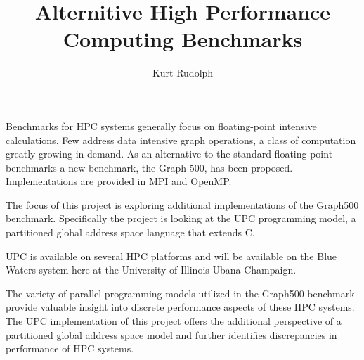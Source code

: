\documentclass[11pt]{article}
\title{Alternitive High Performance Computing Benchmarks}
\author{Kurt Rudolph}
\begin{document}
\maketitle

Benchmarks for HPC systems generally focus on floating-point intensive calculations.  Few address data intensive graph operations, a class of computation greatly growing in demand.  As an alternative to the standard floating-point benchmarks a new benchmark, the Graph 500, has been proposed.  Implementations are provided in MPI and OpenMP.  

The focus of this project is exploring additional implementations of the Graph500 benchmark.  Specifically the project is looking at the UPC programming model, a partitioned global address space language that extends C.  

UPC is available on several HPC platforms and will be available on the Blue Waters system here at the University of Illinois Ubana-Champaign.

The variety of parallel programming models utilized in the Graph500 benchmark provide valuable insight into discrete performance aspects of these HPC systems.  The UPC implementation of this project offers the additional perspective of a partitioned global address space model and further identifies discrepancies in performance of HPC systems.  
\end{document}
